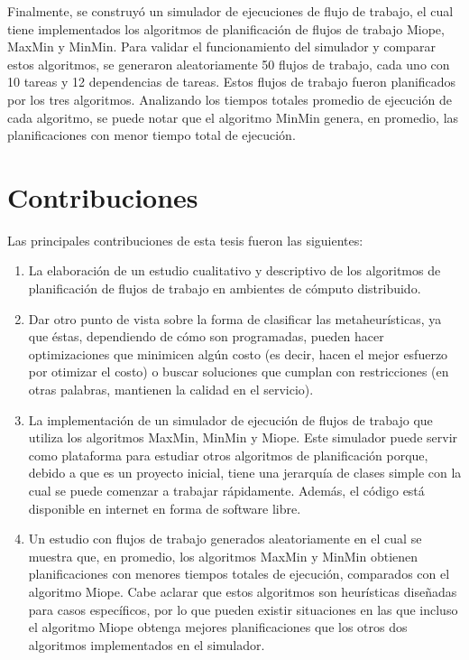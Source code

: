 Finalmente, se construyó un simulador de ejecuciones de flujo de trabajo, el cual tiene implementados los algoritmos de planificación de flujos de trabajo Miope, MaxMin y MinMin. Para validar el funcionamiento del simulador y comparar estos algoritmos, se generaron aleatoriamente 50 flujos de trabajo, cada uno con 10 tareas y 12 dependencias de tareas. Estos flujos de trabajo fueron planificados por los tres algoritmos. Analizando los tiempos totales promedio de ejecución de cada algoritmo, se puede notar que el algoritmo MinMin genera, en promedio, las planificaciones con menor tiempo total de ejecución.

\section{Contribuciones}
Las principales contribuciones de esta tesis fueron las siguientes:
\begin{enumerate}
\item La elaboración de un estudio cualitativo y descriptivo de los algoritmos de planificación de flujos de trabajo en ambientes de cómputo distribuido.
\item Dar otro punto de vista sobre la forma de clasificar las metaheurísticas, ya que éstas, dependiendo de cómo son programadas, pueden hacer optimizaciones que minimicen algún costo (es decir, hacen el mejor esfuerzo por otimizar el costo) o buscar soluciones que cumplan con restricciones (en otras palabras, mantienen la calidad en el servicio).
\item La implementación de un simulador de ejecución de flujos de trabajo que utiliza los algoritmos MaxMin, MinMin y Miope. Este simulador puede servir como plataforma para estudiar otros algoritmos de planificación porque, debido a que es un proyecto inicial, tiene una jerarquía de clases simple con la cual se puede comenzar a trabajar rápidamente. Además, el código está disponible en internet en forma de software libre.
\item Un estudio con flujos de trabajo generados aleatoriamente en el cual se muestra que, en promedio, los algoritmos MaxMin y MinMin obtienen planificaciones con menores tiempos totales de ejecución, comparados con el algoritmo Miope. Cabe aclarar que estos algoritmos son heurísticas diseñadas para casos específicos, por lo que pueden existir situaciones en las que incluso el algoritmo Miope obtenga mejores planificaciones que los otros dos algoritmos implementados en el simulador.
\end{enumerate}

